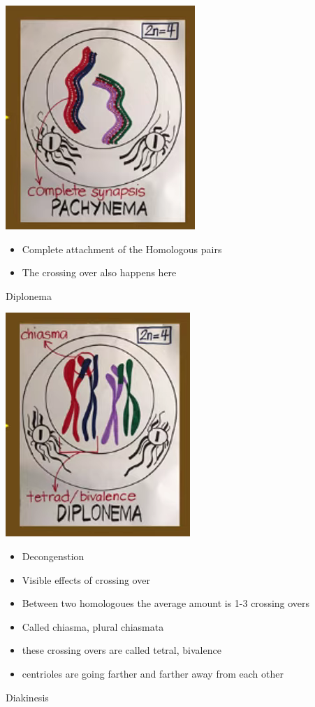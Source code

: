 \documentclass{article}
\begin{document}
\includegraphics*[scale=0.9]{pachynema.png}
\begin{itemize}
    \item Complete attachment of the Homologous pairs
    \item The crossing over also happens here
\end{itemize}
Diplonema


\includegraphics*[scale=0.9]{diplonema.png}
\begin{itemize}
    \item Decongenstion
    \item Visible effects of crossing over
    \item Between two homologoues the average amount is 1-3 crossing overs
    \item Called chiasma, plural chiasmata
    \item these crossing overs are called tetral, bivalence
    \item centrioles are going farther and farther away from each other
\end{itemize}
Diakinesis
\end{document}
